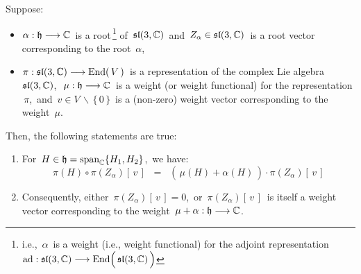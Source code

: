 
\vskip 0.5cm
\begin{lemma} %
\mbox{}
\vskip 0.05cm
\noindent
Suppose:
\begin{itemize}
\item
    $\alpha : \mathfrak{h} \longrightarrow \mathbb{C}$\,
    is a root\,\footnote{i.e.,
    \,$\alpha$\, is a weight (i.e., weight functional) for the adjoint representation
    \,$\ad : \sl(3,\C) \longrightarrow \End\!\left(\,\overset{{\color{white}.}}{\sl(3,\C)}\,\right)$}
    of \,$\mathfrak{sl}(3,\mathbb{C})$\, and
    \,$Z_{\alpha} \in \mathfrak{sl}(3,\mathbb{C})$\, is a root vector corresponding to the root \,$\alpha$,\,
\item
    $\pi : \mathfrak{sl}(3,\mathbb{C}) \longrightarrow \textnormal{End}\!\left(\,V\,\right)$\,
    is a representation of the complex Lie algebra \,$\mathfrak{sl}(3,\mathbb{C})$,\,
    \,$\mu : \mathfrak{h} \longrightarrow \mathbb{C}$\,
    is a weight (or weight functional) for the representation \,$\pi$,\, and
    \,$v \in V\,\backslash\,\{\,0\,\}$\,
    is a (non-zero) weight vector corresponding to the weight \,$\mu$.\,
\end{itemize}
Then, the following statements are true:
\begin{enumerate}
\item
    For \,$H \in \mathfrak{h} = \textnormal{span}_{\mathbb{C}}\{H_{1},H_{2}\}$,\, we have:
    \begin{equation*}
    \pi(H) \circ \pi(Z_{\alpha})[\,v\,]
    \;\; = \;\;
        \left(\,
            \overset{}{
                \mu(H) + \alpha(H)
                }
            \,\right) \cdot \pi(Z_{\alpha})[\,v\,]
    \end{equation*}
\item
    Consequently, either \,$\pi(Z_{\alpha})[\,v\,] = 0$,\, or
    \,$\pi(Z_{\alpha})[\,v\,]$\, is itself a weight vector
    corresponding to the weight
    \,$\mu + \alpha : \mathfrak{h} \longrightarrow \mathbb{C}$.\,
\end{enumerate}
\end{lemma}
\proof
